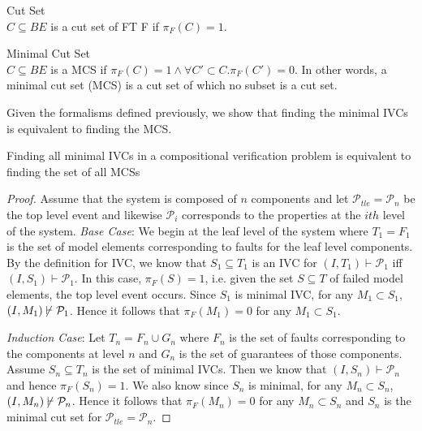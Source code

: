 \begin{definition}Cut Set\\   
 $C \subseteq BE$ is a cut set of FT F if $\pi_F(C) = 1$. \\
\end{definition}

\begin{definition}Minimal Cut Set\\    
$C \subseteq BE$ is a MCS if $\pi_F(C) = 1 \land \forall C' \subset C. \pi_F(C') = 0$. In other words, a minimal cut set (MCS) is a cut set of which no subset is a cut set. \\
\end{definition}

Given the formalisms defined previously, we show that finding the minimal IVCs is equivalent to finding the MCS. \\

\begin{theorem} Finding all minimal IVCs in a compositional verification problem is equivalent to finding the set of all MCSs \\

\begin{proof} 
Assume that the system is composed of $n$ components and let $\mathcal{P}_{tle} = \mathcal{P}_n$ be the top level event and likewise $\mathcal{P}_{i}$ corresponds to the properties at the $i{th}$ level of the system. 
\textit{Base Case}:
We begin at the leaf level of the system where $T_1 = F_1$ is the set of model elements corresponding to faults for the leaf level components. By the definition for IVC, we know that $S_1 \subseteq T_1$ is an IVC for $(I, T_1) \vdash \mathcal{P}_{1}$ iff $(I, S_1) \vdash \mathcal{P}_{1}$.
In this case, $\pi_F(S) = 1$, i.e. given the set $S \subseteq T$ of failed model elements, the top level event occurs. 
Since $S_1$ is minimal IVC, for any $M_1 \subset S_1$, $(I, M_1) \mkern-2mu\not\mkern2mu\vdash \mathcal{P}_{1}$. Hence it follows that $\pi_F(M_1) = 0$ for any $M_1 \subset S_1$.

\textit{Induction Case}:
Let $T_{n} = F_{n} \cup G_{n}$ where $F_{n}$ is the set of faults corresponding to the components at level ${n}$ and $G_{n}$ is the set of guarantees of those components. Assume $S_{n} \subseteq T_{n}$ is the set of minimal IVCs. Then we know that $(I, S_{n}) \vdash \mathcal{P}_{n}$ and hence $\pi_F(S_{n}) = 1$. We also know since $S_{n}$ is minimal, for any $M_{n} \subset S_{n}$, $(I, M_{n}) \mkern-2mu\not\mkern2mu\vdash \mathcal{P}_{n}$. Hence it follows that $\pi_F(M_{n}) = 0$ for any $M_{n} \subset S_{n}$ and $S_{n}$ is the minimal cut set for $\mathcal{P}_{tle} = \mathcal{P}_n$.

\end{proof}
\end{theorem}

